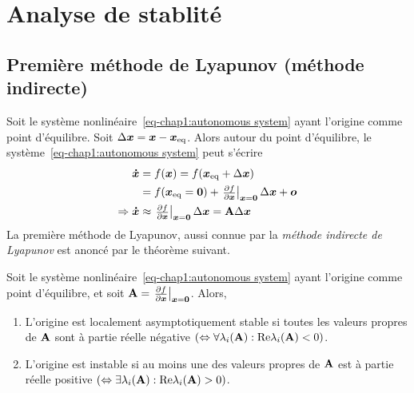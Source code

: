 \section{Analyse de stablité}\label{sec:stability analysis}
\subsection{Première méthode de Lyapunov (méthode indirecte)}
Soit le système nonlinéaire~\eqref{eq-chap1:autonomous system} ayant l'origine comme point d'équilibre. Soit $\Delta \bm{x} = \bm{x}-\bm{x}_{\rm eq}$. Alors autour du point d'équilibre, le système~\eqref{eq-chap1:autonomous system} peut s'écrire
\begin{align}
\begin{split}
\bm{\dot{x}} &= f(\bm{x}) = f(\bm{x}_{\rm eq}+\Delta\bm{x})\\
&=f(\bm{x}_{\rm eq}=\mathbf{0}) + \left.\begin{matrix}
\frac{\partial f}{\partial\bm{x}}
\end{matrix}\right|_{{\bm{x} = \mathbf{0}}}\Delta\bm{x} + \bm{o} \\
\Rightarrow\bm{\dot{x}}&\approx\left.\begin{matrix}
\frac{\partial f}{\partial\bm{x}}
\end{matrix}\right|_{{\bm{x} = \mathbf{0}}}\Delta\bm{x} = \mathbf{A}\Delta\bm{x} 
\end{split}
\end{align} 
La première méthode de Lyapunov, aussi connue par la \emph{méthode indirecte de Lyapunov} est anoncé par le théorème suivant.
\begin{theoreme}
	Soit le système nonlinéaire~\eqref{eq-chap1:autonomous system} ayant l'origine comme point d'équilibre, et soit $\mathbf{A} =\left.\begin{matrix}
	\frac{\partial f}{\partial\bm{x}}
	\end{matrix}\right|_{{\bm{x} = \mathbf{0}}}$. Alors,
	\begin{enumerate}
		\item L'origine est localement asymptotiquement stable si toutes les valeurs propres de $\mathbf{A}$ sont à partie réelle négative $\left(\Leftrightarrow \forall\lambda_i(\mathbf{A}): {\rm Re}\lambda_i(\mathbf{A})<0\right)$.
		\item L'origine est instable si au moins une des valeurs propres de $\mathbf{A}$ est à partie réelle positive $\left(\Leftrightarrow \exists\lambda_i(\mathbf{A}): {\rm Re}\lambda_i(\mathbf{A})>0\right)$.
	\end{enumerate}
\end{theoreme} 
